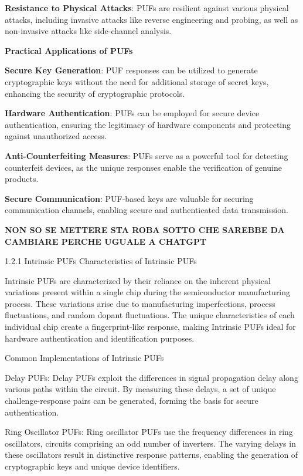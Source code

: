 \documentclass{article}
\begin{document}
\textbf{Resistance to Physical Attacks}: PUFs are resilient against various physical attacks, including invasive attacks like reverse engineering and probing, as well as non-invasive attacks like side-channel analysis.


\textbf{Practical Applications of PUFs}


\textbf{Secure Key Generation}: PUF responses can be utilized to generate cryptographic keys without the need for additional storage of secret keys, enhancing the security of cryptographic protocols.


\textbf{Hardware Authentication}: PUFs can be employed for secure device authentication, ensuring the legitimacy of hardware components and protecting against unauthorized access.


\textbf{Anti-Counterfeiting Measures}: PUFs serve as a powerful tool for detecting counterfeit devices, as the unique responses enable the verification of genuine products.


\textbf{Secure Communication}: PUF-based keys are valuable for securing communication channels, enabling secure and authenticated data transmission.


\textbf{NON SO SE METTERE STA ROBA SOTTO CHE SAREBBE DA CAMBIARE PERCHE UGUALE A CHATGPT}


1.2.1 Intrinsic PUFs
Characteristics of Intrinsic PUFs

Intrinsic PUFs are characterized by their reliance on the inherent physical variations present within a single chip during the semiconductor manufacturing process. These variations arise due to manufacturing imperfections, process fluctuations, and random dopant fluctuations. The unique characteristics of each individual chip create a fingerprint-like response, making Intrinsic PUFs ideal for hardware authentication and identification purposes.

Common Implementations of Intrinsic PUFs

Delay PUFs: Delay PUFs exploit the differences in signal propagation delay along various paths within the circuit. By measuring these delays, a set of unique challenge-response pairs can be generated, forming the basis for secure authentication.

Ring Oscillator PUFs: Ring oscillator PUFs use the frequency differences in ring oscillators, circuits comprising an odd number of inverters. The varying delays in these oscillators result in distinctive response patterns, enabling the generation of cryptographic keys and unique device identifiers.
\end{document}
